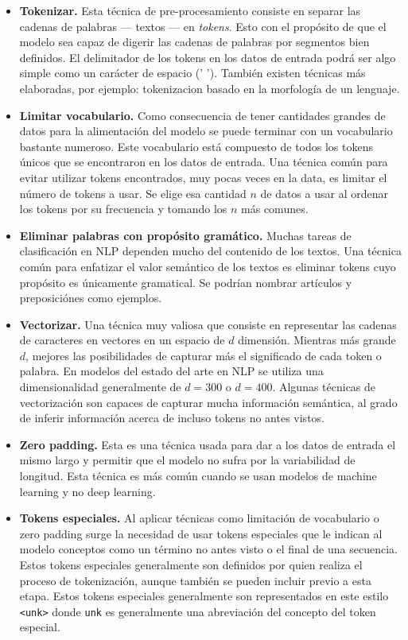 \begin{itemize}
\item \textbf{Tokenizar.} Esta técnica de pre-procesamiento consiste en separar las cadenas de palabras --- textos --- en \emph{tokens}. Esto con el propósito de que el modelo sea capaz de digerir las cadenas de palabras por segmentos bien definidos. El delimitador de los tokens en los datos de entrada podrá ser algo simple como un carácter de espacio (' '). También existen técnicas más elaboradas, por ejemplo: \gls{tokenizacion} basado en la morfología de un lenguaje.
\item \textbf{Limitar \gls{vocabulario}.} Como consecuencia de tener cantidades grandes de datos para la alimentación del modelo se puede terminar con un vocabulario bastante numeroso. Este vocabulario está compuesto de todos los tokens únicos que se encontraron en los datos de entrada. Una técnica común para evitar utilizar tokens encontrados, muy pocas veces en la data, es limitar el número de tokens a usar. Se elige esa cantidad $n$ de datos a usar al ordenar los tokens por su frecuencia y tomando los $n$ más comunes.
\item \textbf{Eliminar palabras con propósito gramático.} Muchas tareas de clasificación en NLP dependen mucho del contenido de los textos. Una técnica común para enfatizar el valor semántico de los textos es eliminar tokens cuyo propósito es únicamente gramatical. Se podrían nombrar artículos y preposiciónes como ejemplos.
\item \textbf{Vectorizar.} Una técnica muy valiosa que consiste en representar las cadenas de caracteres en vectores en un espacio de $d$ dimensión. Mientras más grande $d$, mejores las posibilidades de capturar más el significado de cada token o palabra. En modelos del estado del arte en NLP se utiliza una dimensionalidad generalmente de $d = 300$ o $d = 400$. Algunas técnicas de vectorización son capaces de capturar mucha información semántica, al grado de inferir información acerca de incluso tokens no antes vistos.
\item \textbf{Zero padding.} Esta es una técnica usada para dar a los datos de entrada el mismo largo y permitir que el modelo no sufra por la variabilidad de longitud. Esta técnica es más común cuando se usan modelos de machine learning y no deep learning.
\item \textbf{Tokens especiales.} Al aplicar técnicas como limitación de vocabulario o zero padding surge la necesidad de usar tokens especiales que le indican al modelo conceptos como un término no antes visto o el final de una secuencia. Estos tokens especiales generalmente son definidos por quien realiza el proceso de tokenización, aunque también se pueden incluir previo a esta etapa. Estos tokens especiales generalmente son representados en este estilo \texttt{<unk>} donde \texttt{unk} es generalmente una abreviación del concepto del token especial. 
\end{itemize}

